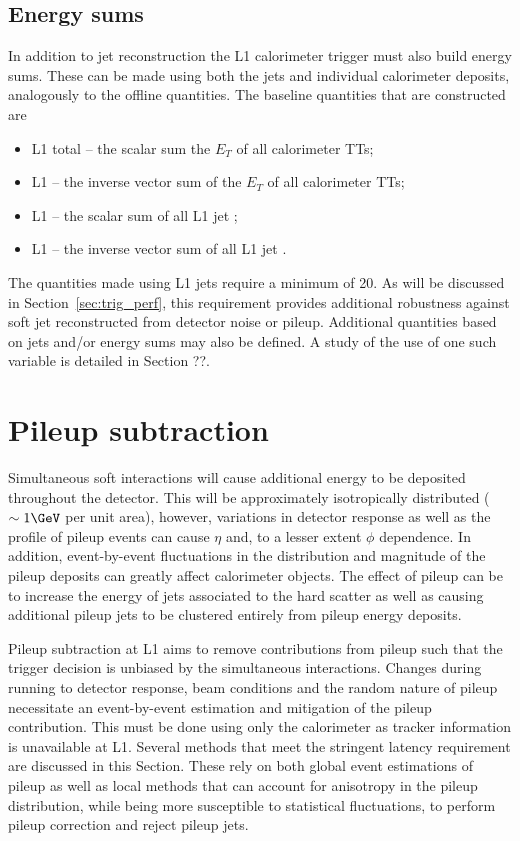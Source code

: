 \subsection{Energy sums}

In addition to jet reconstruction the L1 calorimeter trigger must also build energy sums. 
These can be made using both the jets and individual calorimeter deposits, analogously to
the offline quantities. The baseline quantities that are constructed are

\begin{itemize}
\item L1 total \Et -- the scalar sum the $E_T$ of all calorimeter TTs;
\item L1 \met -- the inverse vector sum of the $E_T$ of all calorimeter TTs;
\item L1 \scalht -- the scalar sum of all L1 jet \pt;
\item L1 \mht -- the inverse vector sum of all L1 jet \pt.
\end{itemize}

The quantities made using L1 jets require a minimum \Lonept of 20\GeV. As will be discussed in 
Section~\ref{sec:trig_perf}, this requirement provides additional robustness against soft
jet reconstructed from detector noise or pileup. Additional quantities based 
on jets and/or energy sums may also be defined. A study of the use of one such variable is detailed in Section ??.

\section{Pileup subtraction}
\label{sec:pileup_algo}
Simultaneous soft interactions will cause additional energy to be deposited throughout
the detector. This will be approximately isotropically distributed ($\sim1\GeV$ per unit area), however, variations
in detector response as well as the profile of pileup events can cause $\eta$ and,
to a lesser extent $\phi$ dependence. In addition, event-by-event fluctuations in the distribution 
and magnitude of the pileup deposits can greatly affect calorimeter objects. 
The effect of pileup can be to increase the energy of jets associated to the hard 
scatter as well as causing additional pileup jets
to be clustered entirely from pileup energy deposits.

Pileup subtraction at L1 aims to remove contributions from pileup such that the trigger
decision is unbiased by the simultaneous interactions. Changes during running
to detector response, beam conditions and the random nature of pileup necessitate an event-by-event
estimation and mitigation of the pileup contribution. This must be done using only the calorimeter as 
tracker information is unavailable at L1. Several methods that meet the stringent latency requirement
are discussed in this Section. These rely on both global event estimations of pileup as well as 
local methods that can account for anisotropy in the pileup distribution, while being more susceptible 
to statistical fluctuations, to perform pileup correction and reject pileup jets.

